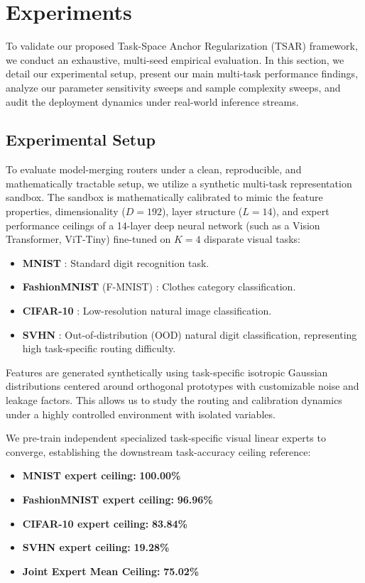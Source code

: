 \section{Experiments}
\label{sec:experiments}

To validate our proposed Task-Space Anchor Regularization (TSAR) framework, we conduct an
exhaustive, multi-seed empirical evaluation. In this section, we detail our experimental setup,
present our main multi-task performance findings, analyze our parameter sensitivity sweeps and
sample complexity sweeps, and audit the deployment dynamics under real-world inference streams.

\subsection{Experimental Setup}
To evaluate model-merging routers under a clean, reproducible, and mathematically tractable setup,
we utilize a synthetic multi-task representation sandbox. The sandbox is mathematically calibrated
to mimic the feature properties, dimensionality ($D=192$), layer structure ($L=14$), and expert
performance ceilings of a 14-layer deep neural network (such as a Vision Transformer, ViT-Tiny)
fine-tuned on $K=4$ disparate visual tasks:
\begin{itemize}
  \item \textbf{MNIST} \cite{lecun1998mnist}: Standard digit recognition task.
  \item \textbf{FashionMNIST} (F-MNIST) \cite{xiao2017fashion}: Clothes category classification.
  \item \textbf{CIFAR-10} \cite{krizhevsky2009cifar}: Low-resolution natural image classification.
  \item \textbf{SVHN} \cite{netzer2011svhn}: Out-of-distribution (OOD) natural digit
classification, representing high task-specific routing difficulty.
\end{itemize}
Features are generated synthetically using task-specific isotropic Gaussian distributions centered
around orthogonal prototypes with customizable noise and leakage factors. This allows us to study
the routing and calibration dynamics under a highly controlled environment with isolated variables.

We pre-train independent specialized task-specific visual linear experts to converge, establishing
the downstream task-accuracy ceiling reference:
\begin{itemize}
  \item \textbf{MNIST expert ceiling:} \textbf{100.00\%}
  \item \textbf{FashionMNIST expert ceiling:} \textbf{96.96\%}
  \item \textbf{CIFAR-10 expert ceiling:} \textbf{83.84\%}
  \item \textbf{SVHN expert ceiling:} \textbf{19.28\%}
  \item \textbf{Joint Expert Mean Ceiling:} \textbf{75.02\%}
\end{itemize}

